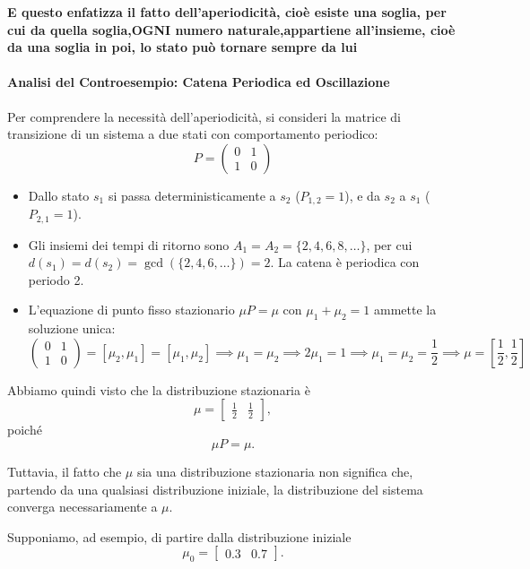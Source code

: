\textbf{E questo enfatizza il fatto dell'aperiodicità, cioè esiste una soglia, per cui da quella soglia,OGNI numero naturale,appartiene all'insieme,
cioè da una soglia in poi, lo stato può tornare sempre da lui}

\paragraph{Analisi del Controesempio: Catena Periodica ed Oscillazione}
Per comprendere la necessità dell'aperiodicità, si consideri la matrice di transizione di un sistema a due stati con comportamento periodico:
\begin{equation*}
P = \begin{pmatrix} 0 & 1 \\ 1 & 0 \end{pmatrix}
\end{equation*}
\begin{itemize}
    \item Dallo stato $s_1$ si passa deterministicamente a $s_2$ ($P_{1,2} = 1$), e da $s_2$ a $s_1$ ($P_{2,1} = 1$).
    \item Gli insiemi dei tempi di ritorno sono $A_1 = A_2 = \{2, 4, 6, 8, \dots\}$, per cui $d(s_1) = d(s_2) = \gcd(\{2, 4, 6, \dots\}) = 2$. La catena è periodica con periodo 2.
    \item L'equazione di punto fisso stazionario $\mu P = \mu$ con $\mu_1 + \mu_2 = 1$ ammette la soluzione unica:
    \begin{equation*}
    [\mu_1, \mu_2] \begin{pmatrix} 0 & 1 \\ 1 & 0 \end{pmatrix} = [\mu_2, \mu_1] = [\mu_1, \mu_2] \implies \mu_1 = \mu_2 \implies 2\mu_1 = 1 \implies \mu_1 = \mu_2 = \frac{1}{2} \implies \mu = \left[\frac{1}{2}, \frac{1}{2}\right]
    \end{equation*}
\end{itemize}
Abbiamo quindi visto che la distribuzione stazionaria è
\[
\mu=
\begin{bmatrix}
\frac{1}{2} & \frac{1}{2}
\end{bmatrix},
\]
poiché
\[
\mu P=\mu.
\]

Tuttavia, il fatto che $\mu$ sia una distribuzione stazionaria
non significa che, partendo da una qualsiasi distribuzione iniziale,
la distribuzione del sistema converga necessariamente a $\mu$.

Supponiamo, ad esempio, di partire dalla distribuzione iniziale
\[
\mu_0=
\begin{bmatrix}
0.3 & 0.7
\end{bmatrix}.
\]

